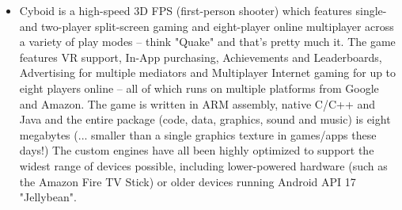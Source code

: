 {\begin{itemize}
      \item Cyboid is a high-speed 3D FPS (first-person shooter) which features single- and two-player split-screen gaming and eight-player online multiplayer across a variety of play modes -- think "Quake" and that's pretty much it. The game features VR support, In-App purchasing, Achievements and Leaderboards, Advertising for multiple mediators and Multiplayer Internet gaming for up to eight players online -- all of which runs on multiple platforms from Google and Amazon. The game is written in ARM assembly, native C/C++ and Java and the entire package (code, data, graphics, sound and music) is eight megabytes (... smaller than a single graphics texture in games/apps these days!) The custom engines have all been highly optimized to support the widest range of devices possible, including lower-powered hardware (such as the Amazon Fire TV Stick) or older devices running Android API 17 "Jellybean".
     \end{itemize}
     }
 




